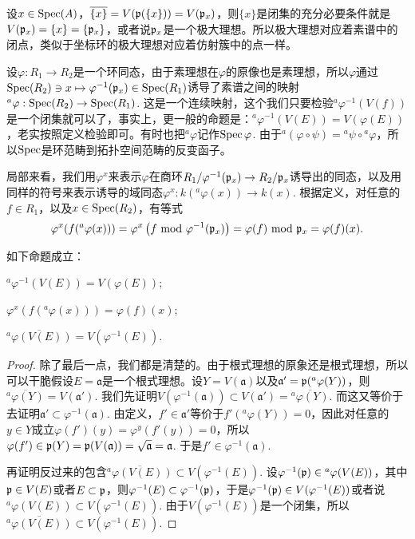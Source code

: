 设$x\in \operatorname{Spec}(A)$，$\overline{\{x\}}=V(\mathfrak{p}(\{x\}))=V(\mathfrak{p}_x)$，则$\{x\}$是闭集的充分必要条件就是$V(\mathfrak{p}_x)=\{x\}=\{\mathfrak{p}_x\}$，或者说$\mathfrak{p}_x$是一个极大理想。所以极大理想对应着素谱中的闭点，类似于坐标环的极大理想对应着仿射簇中的点一样。

\begin{para}
设$\varphi:R_1\to R_2$是一个环同态，由于素理想在$\varphi$的原像也是素理想，所以$\varphi$通过$\operatorname{Spec}(R_2)\ni x\mapsto \varphi^{-1}(\mathfrak{p}_x)\in \operatorname{Spec}(R_1)$诱导了素谱之间的映射$^a\varphi:\operatorname{Spec}(R_2)\to \operatorname{Spec}(R_1)$. 这是一个连续映射，这个我们只要检验$^a\varphi^{-1}(V(f))$是一个闭集就可以了，事实上，更一般的命题是：$^a\varphi^{-1}(V(E))=V(\varphi(E))$，老实按照定义检验即可。有时也把$^a\varphi$记作$\operatorname{Spec} \varphi$. 由于$^a(\varphi\circ \psi)={^a\psi}\circ{^a\varphi}$，所以$\operatorname{Spec}$是环范畴到拓扑空间范畴的反变函子。

局部来看，我们用$\varphi^x$来表示$\varphi$在商环$R_1/\varphi^{-1}(\mathfrak{p}_x)\to R_2/\mathfrak{p}_x$诱导出的同态，以及用同样的符号来表示诱导的域同态$\varphi^x:k({^a}\varphi(x))\to k(x)$. 根据定义，对任意的$f\in R_1$，以及$x\in \operatorname{Spec}(R_2)$，有等式
\[
	\varphi^x(f({^a}\varphi(x)))=\varphi^x\left(f \text{ mod } \varphi^{-1}(\mathfrak{p}_x)\right)=\varphi(f)\text{ mod } \mathfrak{p}_x=\varphi(f)(x).
\]
\end{para}

\begin{pro}\label{pro:3.8}
如下命题成立：
\begin{compactenum}[~~~1.]
\item $^a\varphi^{-1}(V(E))=V(\varphi(E))$;
\item $\varphi^x(f({^a}\varphi(x)))=\varphi(f)(x)$;
\item $\overline{{^a}\varphi(V(E))}=V(\varphi^{-1}(E))$.
\end{compactenum}
\end{pro}

\begin{proof}
除了最后一点，我们都是清楚的。由于根式理想的原象还是根式理想，所以可以干脆假设$E=\mathfrak{a}$是一个根式理想。设$Y=V(\mathfrak{a})$以及$\mathfrak{a}'=\mathfrak{p}({^a}\varphi(Y))$，则$\overline{{^a}\varphi(Y)}=V(\mathfrak{a}')$. 我们先证明$V(\varphi^{-1}(\mathfrak{a}))\subset V(\mathfrak{a}')=\overline{{^a}\varphi(Y)}$. 而这又等价于去证明$\mathfrak{a}'\subset \varphi^{-1}(\mathfrak{a})$. 由定义，$f'\in \mathfrak{a}'$等价于$f'({^a\varphi}(Y))=0$，因此对任意的$y\in Y$成立$\varphi(f')(y)=\varphi^y(f'(y))=0$，所以$\varphi(f')\in \mathfrak{p}(Y)=\mathfrak{p}(V(\mathfrak{a}))=\sqrt{\mathfrak{a}}=\mathfrak{a}$. 于是$f'\in \varphi^{-1}(\mathfrak{a})$.

再证明反过来的包含$\overline{{^a}\varphi(V(E))}\subset V(\varphi^{-1}(E))$. 设$\varphi^{-1}(\mathfrak{p})\in {^a}\varphi(V(E))$，其中$\mathfrak{p}\in V(E)$或者$E\subset \mathfrak{p}$，则$\varphi^{-1}(E)\subset \varphi^{-1}(\mathfrak{p})$，于是$\varphi^{-1}(\mathfrak{p})\in V(\varphi^{-1}(E))$或者说${^a}\varphi(V(E))\subset V(\varphi^{-1}(E))$. 由于$V(\varphi^{-1}(E))$是一个闭集，所以$\overline{{^a}\varphi(V(E))}\subset V(\varphi^{-1}(E))$.
\end{proof}

